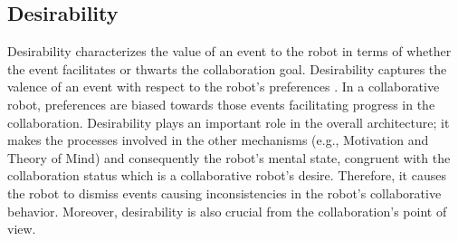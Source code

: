 \documentclass[12pt]{report}
\begin{document}
\subsection{Desirability}
Desirability characterizes the value of an event to the robot in terms of
whether the event facilitates or thwarts the collaboration goal. Desirability
captures the valence of an event with respect to the robot's preferences
\cite{gratch:domain-independent}. In a collaborative robot, preferences are
biased towards those events facilitating progress in the collaboration.
Desirability plays an important role in the overall architecture; it makes the
processes involved in the other mechanisms (e.g., Motivation and Theory of
Mind) and consequently the robot's mental state, congruent with the
collaboration status which is a collaborative robot's desire. Therefore, it
causes the robot to dismiss events causing inconsistencies in the robot's
collaborative behavior. Moreover, desirability is also crucial from the
collaboration's point of view.

\end{document}
